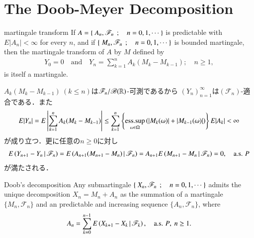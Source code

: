 \section{The Doob-Meyer Decomposition}
	\begin{itembox}[l]{martingale transform}
		If $A = \left\{\ A_n,\mathscr{F}_n\ \, ; \quad n=0,1,\cdots\ \right\}$ is predictable with $E|A_n|<\infty$ for every $n$,
		and if $\left\{\ M_n,\mathscr{F}_n\ \, ; \quad n=0,1,\cdots\ \right\}$ is bounded martingale, then the martingale transform of $A$
		by $M$ defined by
		\begin{align}
			Y_0 = 0 \quad \mbox{and} \quad
			Y_n = \sum_{k=1}^n A_k (M_k - M_{k-1});
			\quad n \geq 1, 
		\end{align}
		is itself a martingale.
	\end{itembox}
	
	\begin{prf}
		$A_k(M_k - M_{k-1})\ (k \leq n)$は$\mathscr{F}_n/\mathscr{B}(\mathbb{R})$-可測であるから
		$(Y_n)_{n=1}^\infty$は$(\mathscr{F}_n)$-適合である．また
		\begin{align}
			E|Y_n| = E\left| \sum_{k=1}^n A_k (M_k - M_{k-1}) \right|
			\leq \sum_{k=1}^n \left\{\operatorname*{ess\mbox{.}sup}_{\omega \in \Omega} \left(|M_k(\omega)|+|M_{k-1}(\omega)|\right)\right\} E|A_k| < \infty
		\end{align}
		が成り立つ．更に任意の$n \geq 0$に対し
		\begin{align}
			E\left( Y_{n+1} - Y_n \, \middle|\, \mathscr{F}_n \right)
			= E\left( A_{n+1}(M_{n+1} - M_n) \, \middle|\, \mathscr{F}_n \right)
			= A_{n+1}E\left( M_{n+1} - M_n \, \middle|\, \mathscr{F}_n \right)
			= 0,
			\quad \mbox{a.s. $P$}
		\end{align}
		が満たされる．
		\QED
	\end{prf}
	
	\begin{itembox}[l]{Doob's decomposition}
		Any submartingale $\left\{\ X_n,\mathscr{F}_n\ \, ; \quad n=0,1,\cdots\ \right\}$ admits the unique decomposition
		$X_n = M_n + A_n$ as the summation of a martingale $\{M_n,\mathscr{F}_n\}$ and an 
		predictable and increasing sequence $\{A_n,\mathscr{F}_n\}$, where
		\begin{align}
			A_n = \sum_{k=0}^{n-1}E\left( X_{k+1}-X_k \, \middle|\, \mathscr{F}_k \right),
			\quad \mbox{a.s. $P$},\ n \geq 1.
		\end{align}
	\end{itembox}
	
